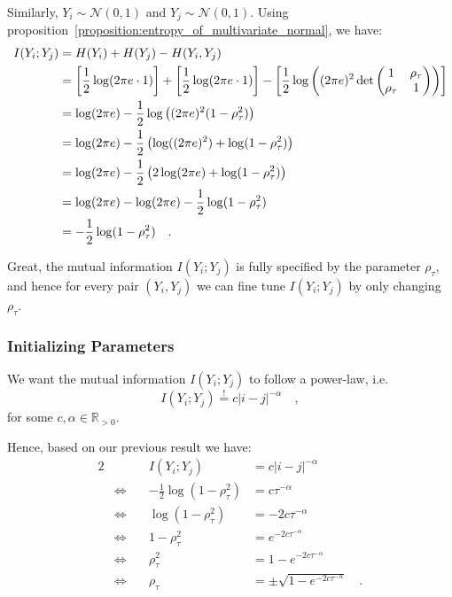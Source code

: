 \documentclass[../../main.tex]{subfiles}
\begin{document}
Similarly, $Y_i \sim \mathcal{N}(0, 1)$ and $Y_j \sim \mathcal{N}(0, 1)$. Using proposition~\ref{proposition:entropy_of_multivariate_normal}, we have:
\begin{align}
    I(Y_i; Y_j) &= H(Y_i) + H(Y_j) - H(Y_i, Y_j) \notag \\
    &= \left[ \frac{1}{2} \log(2\pi e \cdot 1) \right] + \left[ \frac{1}{2} \log(2\pi e \cdot 1) \right] - \left[ \frac{1}{2} \log\left( (2\pi e)^2 \det\begin{pmatrix*} 1 & \rho_\tau \\ \rho_\tau & 1 \end{pmatrix*} \right) \right] \notag \\
    &= \log(2\pi e) - \frac{1}{2} \log\left( (2\pi e)^2 (1-\rho_\tau^2) \right) \notag \\
    &= \log(2\pi e) - \frac{1}{2} \left( \log((2\pi e)^2) + \log(1-\rho_\tau^2) \right) \notag \\
    &= \log(2\pi e) - \frac{1}{2} \left( 2\log(2\pi e) + \log(1-\rho_\tau^2) \right) \notag \\
    &= \log(2\pi e) - \log(2\pi e) - \frac{1}{2}\log(1-\rho_\tau^2) \notag \\
    &= -\frac{1}{2}\log(1-\rho_\tau^2) \label{eq:gauss_mutual_information} \quad .
\end{align}

Great, the mutual information $I(Y_i; Y_j)$ is fully specified by the parameter $\rho_\tau$, and hence for every pair $(Y_i, Y_j)$ we can fine tune $I(Y_i; Y_j)$ by only changing $\rho_\tau$.

\subsubsection{Initializing Parameters}
We want the mutual information $I(Y_i; Y_j)$ to follow a power-law, i.e.
\[
    I(Y_i; Y_j) \overset{!}{=} c |i-j|^{-\alpha} \quad ,
\]
for some $c, \alpha \in \mathbb{R}_{>0}$.

Hence, based on our previous result we have:
\begin{alignat*}{2}
    && I(Y_i; Y_j) &= c |i-j|^{-\alpha} \\
    & \iff \quad & -\frac{1}{2}\log(1-\rho_\tau^2) &= c \tau^{-\alpha} \\
    & \iff \quad & \log(1-\rho_\tau^2) &= -2c \tau^{-\alpha} \\
    & \iff \quad & 1-\rho_\tau^2 &= e^{-2c \tau^{-\alpha}} \\
    & \iff \quad & \rho_\tau^2 &= 1 - e^{-2c \tau^{-\alpha}} \\
    & \iff \quad & \rho_\tau &= \pm \sqrt{1 - e^{-2c \tau^{-\alpha}}} \quad . \\
\end{alignat*}
\end{document}
